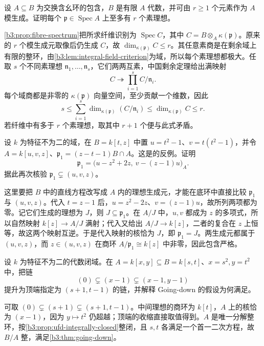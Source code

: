 \begin{exercise}\label{b3:ex:05-finite-prime-fibres}
	设 \(A\subseteq B\) 为交换含幺环的包含，\(B\) 是有限 \(A\) 代数，并可由 \(r\ge1\) 个元素作为 \(A\) 模生成。证明每个 \(\mathfrak p\in\operatorname{Spec}A\) 上至多有 \(r\) 个素理想。
\end{exercise}
\begin{solution}
	\cref{b3:prop:fibre-spectrum}把所求纤维识别为 \(\operatorname{Spec}C\)，其中 \(C=B\otimes_A\kappa(\mathfrak p)\)。原来的 \(r\) 个模生成元取像后仍生成 \(C\)，故 \(\dim_{\kappa(\mathfrak p)}C\le r\)。其任意素商是在剩余域上有限的整环，由\cref{b3:lem:integral-field-criterion}为域，所以每个素理想都极大。任取 \(s\) 个不同素理想 \(\mathfrak n_1,\ldots,\mathfrak n_s\)，它们两两互素，中国剩余定理给出满映射
	\[
		C\twoheadrightarrow\prod_{i=1}^s C/\mathfrak n_i.
	\]
	每个域商都是非零的 \(\kappa(\mathfrak p)\) 向量空间，至少贡献一个维数，因此
	\[
		s\le\sum_{i=1}^s\dim_{\kappa(\mathfrak p)}(C/\mathfrak n_i) \le\dim_{\kappa(\mathfrak p)}C\le r.
	\]
	若纤维中有多于 \(r\) 个素理想，取其中 \(r+1\) 个便与此式矛盾。
\end{solution}

\begin{exercise}\label{b3:ex:05-going-down-explicit-ideal}
	设 \(k\) 为特征不为二的域，在 \(B=k[t,z]\) 中置 \(u=t^2-1\)、\(v=t(t^2-1)\)，并令 \(A=k[u,v,z]\)、\(\mathfrak p_1=(z-t-1)B\cap A\)。这是的反例。证明
	\[
		\mathfrak p_1=\bigl(u-z^2+2z,\ v-(z-1)u\bigr)_A.
	\]
	据此再次核验 \(\mathfrak p_1\subsetneq(u,v,z)\)。
\end{exercise}
\begin{solution}
	这里要把 \(B\) 中的直线方程改写成 \(A\) 内的理想生成元，才能在底环中直接比较 \(\mathfrak p_1\) 与 \((u,v,z)\)。代入 \(t=z-1\) 后，\(u=z^2-2z\)、\(v=(z-1)u\)，故所列两项都为零。记它们生成的理想为 \(J\)，则 \(J\subseteq\mathfrak p_1\)。在 \(A/J\) 中，\(u,v\) 都成为 \(z\) 的多项式，所以自然映射 \(k[z]\to A/J\) 满射；代入又给出 \(A/J\to k[z]\)，二者的复合在 \(z\) 上恒等，故这两个映射互逆。于是代入映射的核恰为 \(J\)，即 \(\mathfrak p_1=J\)。两生成元都属于 \((u,v,z)\)，而 \(z\in(u,v,z)\) 在商环 \(A/\mathfrak p_1\cong k[z]\) 中非零，因此包含严格。
\end{solution}

\begin{exercise}\label{b3:ex:05-prescribed-top}
	设 \(k\) 为特征不为二的代数闭域。在 \(A=k[x,y]\subseteq B=k[s,t]\)、\(x=s^2,y=t^2\) 中，把链
	\[
		(0)\subsetneq(x-1)\subsetneq(x-1,y-1)
	\]
	提升为顶端指定为 \((s+1,t-1)\) 的链，并解释 Going-down 的假设为何满足。
\end{exercise}
\begin{solution}
	可取 \((0)\subsetneq(s+1)\subsetneq(s+1,t-1)\)。中间理想的商环为 \(k[t]\)，\(A\) 上的核恰为 \((x-1)\)，因为 \(y\mapsto t^2\) 仍超越；顶端的收缩直接取值得到。\(A\) 是唯一分解整环，按\cref{b3:prop:ufd-integrally-closed}整闭，且 \(s,t\) 各满足一个首一二次方程，故 \(B/A\) 整，满足\cref{b3:thm:going-down}。
\end{solution}

